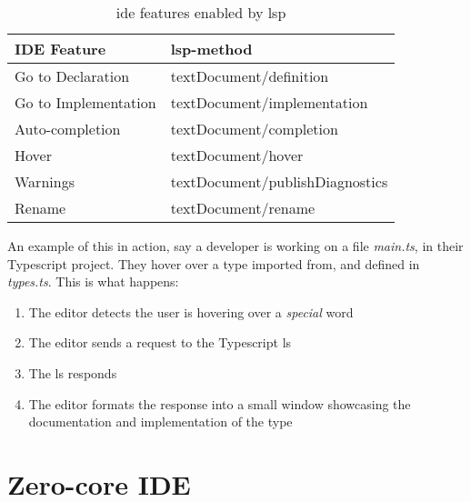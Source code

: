 \begin{table}[]
  \centering
  \caption{\gls{ide} features enabled by \gls{lsp}}
  \label{tbl:ide}
  \begin{tabular}{|l|l|}
    \hline
    IDE Feature & \gls{lsp}-method \\ \hline
    Go to Declaration & textDocument/definition \\ \hline
    Go to Implementation & textDocument/implementation \\ \hline
    Auto-completion & textDocument/completion \\ \hline
    Hover & textDocument/hover \\ \hline
    Warnings & textDocument/publishDiagnostics \\ \hline
    Rename & textDocument/rename \\ \hline
  \end{tabular}
\end{table}

An example of this in action, say a developer is working on a file
\textit{main.ts}, in their Typescript project. They hover over a type imported
from, and defined in \textit{types.ts}. This is what happens:

\begin{enumerate}
  \item The editor detects the user is hovering over a \textit{special} word
  \item The editor sends a request to the Typescript \gls{ls}
  \item The \gls{ls} responds
  \item The editor formats the response into a small window showcasing the
    documentation and implementation of the type
\end{enumerate}

\section{Zero-core IDE}

